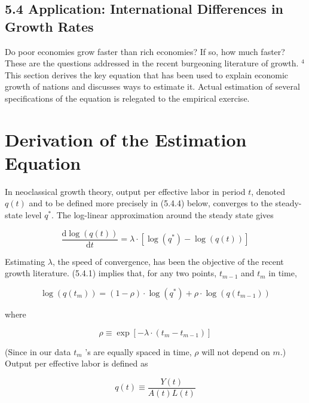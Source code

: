 \documentclass[10pt]{article}
\begin{document}
\subsection*{5.4 Application: International Differences in Growth Rates}
Do poor economies grow faster than rich economies? If so, how much faster? These are the questions addressed in the recent burgeoning literature of growth. ${ }^{4}$ This section derives the key equation that has been used to explain economic growth of nations and discusses ways to estimate it. Actual estimation of several specifications of the equation is relegated to the empirical exercise.

\section*{Derivation of the Estimation Equation}
In neoclassical growth theory, output per effective labor in period $t$, denoted $q(t)$ and to be defined more precisely in (5.4.4) below, converges to the steady-state level $q^{*}$. The log-linear approximation around the steady state gives


\begin{equation*}
\frac{\mathrm{d} \log (q(t))}{\mathrm{d} t}=\lambda \cdot\left[\log \left(q^{*}\right)-\log (q(t))\right] \tag{5.4.1}
\end{equation*}


Estimating $\lambda$, the speed of convergence, has been the objective of the recent growth literature. (5.4.1) implies that, for any two points, $t_{m-1}$ and $t_{m}$ in time,


\begin{equation*}
\log \left(q\left(t_{m}\right)\right)=(1-\rho) \cdot \log \left(q^{*}\right)+\rho \cdot \log \left(q\left(t_{m-1}\right)\right) \tag{5.4.2}
\end{equation*}


where


\begin{equation*}
\rho \equiv \exp \left[-\lambda \cdot\left(t_{m}-t_{m-1}\right)\right] \tag{5.4.3}
\end{equation*}


(Since in our data $t_{m}$ 's are equally spaced in time, $\rho$ will not depend on $m$.) Output per effective labor is defined as


\begin{equation*}
q(t) \equiv \frac{Y(t)}{A(t) L(t)} \tag{5.4.4}
\end{equation*}
\end{document}

